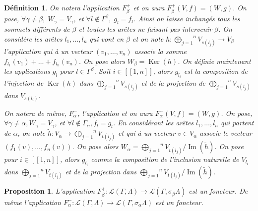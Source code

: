 \documentclass[a4paper,10pt]{article}
\newtheorem{defi}{Définition}[section]
\newtheorem{prop}{Proposition}[section]
\DeclareMathOperator{\Ker}{Ker}
\DeclareMathOperator{\Img}{Im}
\begin{document}
\begin{defi}
	On notera l'application $F_{\beta}^{+}$ et on aura $F_{\beta}^{+}(V,f)=(W,g)$. On pose, $\forall \gamma\neq\beta,\;W_{\gamma}=V_{\gamma}$, et $\forall l \notin \Gamma^{\beta},\; g_{l}=f_{l}$. Ainsi on laisse inchangés tous les sommets différents de $\beta$ et toutes les arêtes ne faisant pas intervenir $\beta$. On considère les arêtes $l_{1},\dots,l_{n}$ qui vont en $\beta$ et on note $h:\overset{n}{\underset{j=1}{\bigoplus}}V_{s(l_{j})}\rightarrow V_{\beta}$ l'application qui à un vecteur $(v_{1},\dots,v_{n})$ associe la somme $f_{l_{1}}(v_{1})+\dots+f_{l_{n}}(v_{n})$. On pose alors $W_{\beta}=\Ker(h)$. On définie maintenant les applications $g_{l}$ pour $l\in\Gamma^{\beta}$. Soit $i\in[\![1,n]\!]$, alors $g_{l_{i}}$ est la composition de l'injection de $\Ker(h)$ dans $\overset{n}{\underset{j=1}{\bigoplus}}V_{s(l_{j})}$ et de la projection de $\overset{n}{\underset{j=1}{\bigoplus}}V_{s(l_{j})}$ dans $V_{s(l_{i})}$. 

	On notera de même, $F^{-}_{\alpha}$, l'application et on aura $F^{-}_{\alpha}(V,f) = (W,g)$. On pose, $\forall \gamma \neq \alpha, W_\gamma = V_\gamma$, et $\forall l \notin \Gamma_\alpha, f_l = g_l$. En considérant les arêtes $l_1, \dots, l_n$ qui partent de $\alpha$, on note $\tilde{h} : V_\alpha \rightarrow \overset{n}{\underset{j=1}{\bigoplus}}V_{t(l_{j})}$ et qui à un vecteur $v \in V_\alpha$ associe le vecteur $(f_1(v),\dots, f_n(v))$. On pose alors $W_\alpha = \overset{n}{\underset{j=1}{\bigoplus}}V_{t(l_{j})}/\Img(\tilde{h})$. On pose pour $i\in [\![1,n]\!]$, alors $g_{l_i}$ comme la composition de l'inclusion naturelle de $V_{l_i}$ dans $\overset{n}{\underset{j=1}{\bigoplus}}V_{t(l_{j})}$ et de la projection dans $\overset{n}{\underset{j=1}{\bigoplus}}V_{t(l_{j})}/\Img(\tilde h)$.

\end{defi}

\begin{prop}
	L'application $F_{\beta}^{+}:\mathscr{L}(\Gamma,\Lambda)\rightarrow\mathscr{L}(\Gamma,\sigma_{\beta}\Lambda)$ est un foncteur. De même l'application $F_{\alpha}^{-}:\mathscr{L}(\Gamma,\Lambda)\rightarrow\mathscr{L}(\Gamma,\sigma_{\alpha}\Lambda)$ est un foncteur.
\end{prop}
\end{document}
